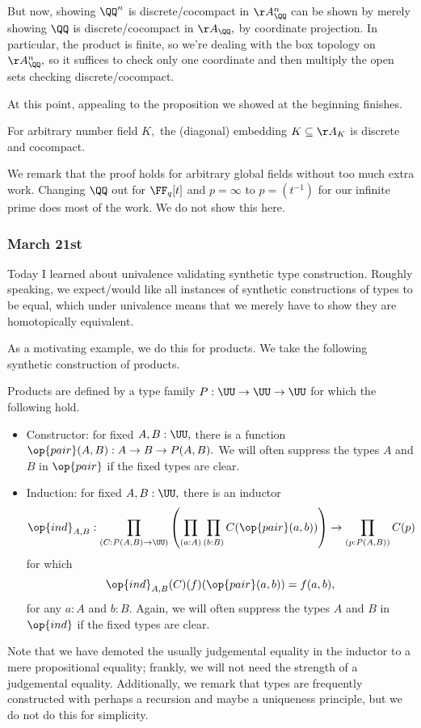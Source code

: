 But now, showing $\QQ^n$ is discrete/cocompact in $\AA_\QQ^n$ can be shown by merely showing $\QQ$ is discrete/cocompact in $\AA_\QQ,$ by coordinate projection. In particular, the product is finite, so we're dealing with the box topology on $\AA_\QQ^n,$ so it suffices to check only one coordinate and then multiply the open sets checking discrete/cocompact.

At this point, appealing to the proposition we showed at the beginning finishes.
\begin{theorem}
    For arbitrary number field $K,$ the (diagonal) embedding $K\subseteq\AA_K$ is discrete and cocompact.
\end{theorem}
We remark that the proof holds for arbitrary global fields without too much extra work. Changing $\QQ$ out for $\FF_q[t]$ and $p=\infty$ to $p=(t^{-1})$ for our infinite prime does most of the work. We do not show this here.

\subsubsection{March 21st}
Today I learned about univalence validating synthetic type construction. Roughly speaking, we expect/would like all instances of synthetic constructions of types to be equal, which under univalence means that we merely have to show they are homotopically equivalent.

As a motivating example, we do this for products. We take the following synthetic construction of products.
\begin{definition}
    Products are defined by a type family $P:\UU\to\UU\to\UU$ for which the following hold.
    \begin{itemize}
        \item Constructor: for fixed $A,B:\UU,$ there is a function $\op{pair}(A,B):A\to B\to P(A,B).$ We will often suppress the types $A$ and $B$ in $\op{pair}$ if the fixed types are clear.
        \item Induction: for fixed $A,B:\UU,$ there is an inductor
        \[\op{ind}_{A,B}:\prod_{(C:P(A,B)\to\UU)}\left(\prod_{(a:A)}\prod_{(b:B)}C(\op{pair}(a,b))\right)\to\prod_{(p:P(A,B))}C(p)\]
        for which
        \[\op{ind}_{A,B}(C)(f)(\op{pair}(a,b))=f(a,b),\]
        for any $a:A$ and $b:B.$ Again, we will often suppress the types $A$ and $B$ in $\op{ind}$ if the fixed types are clear.
    \end{itemize}
\end{definition}
Note that we have demoted the usually judgemental equality in the inductor to a mere propositional equality; frankly, we will not need the strength of a judgemental equality. Additionally, we remark that types are frequently constructed with perhaps a recursion and maybe a uniqueness principle, but we do not do this for simplicity.

